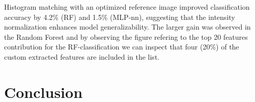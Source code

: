 \documentclass[11pt,a4paper]{article}
\begin{document}
Histogram matching with an optimized reference image improved 
classification accuracy by 4.2\% (RF) and 1.5\% (MLP-nn), 
suggesting that the intensity normalization enhances model generalizability. 
The larger gain was observed in the Random Forest and by observing the figure refering to the
top 20 features contribution for the RF-classification we can inspect that four (20\%) of the 
custom extracted features are included in the list.

\section{Conclusion}





 
\end{document}
